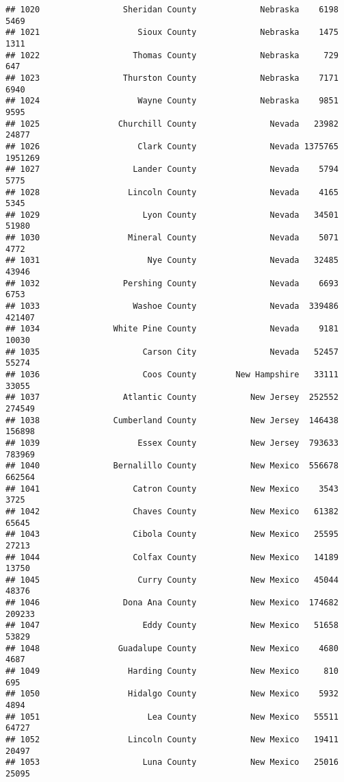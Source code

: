 \documentclass[
]{article}
\begin{document}
\begin{verbatim}
## 1020                 Sheridan County             Nebraska    6198    5469
## 1021                    Sioux County             Nebraska    1475    1311
## 1022                   Thomas County             Nebraska     729     647
## 1023                 Thurston County             Nebraska    7171    6940
## 1024                    Wayne County             Nebraska    9851    9595
## 1025                Churchill County               Nevada   23982   24877
## 1026                    Clark County               Nevada 1375765 1951269
## 1027                   Lander County               Nevada    5794    5775
## 1028                  Lincoln County               Nevada    4165    5345
## 1029                     Lyon County               Nevada   34501   51980
## 1030                  Mineral County               Nevada    5071    4772
## 1031                      Nye County               Nevada   32485   43946
## 1032                 Pershing County               Nevada    6693    6753
## 1033                   Washoe County               Nevada  339486  421407
## 1034               White Pine County               Nevada    9181   10030
## 1035                     Carson City               Nevada   52457   55274
## 1036                     Coos County        New Hampshire   33111   33055
## 1037                 Atlantic County           New Jersey  252552  274549
## 1038               Cumberland County           New Jersey  146438  156898
## 1039                    Essex County           New Jersey  793633  783969
## 1040               Bernalillo County           New Mexico  556678  662564
## 1041                   Catron County           New Mexico    3543    3725
## 1042                   Chaves County           New Mexico   61382   65645
## 1043                   Cibola County           New Mexico   25595   27213
## 1044                   Colfax County           New Mexico   14189   13750
## 1045                    Curry County           New Mexico   45044   48376
## 1046                 Dona Ana County           New Mexico  174682  209233
## 1047                     Eddy County           New Mexico   51658   53829
## 1048                Guadalupe County           New Mexico    4680    4687
## 1049                  Harding County           New Mexico     810     695
## 1050                  Hidalgo County           New Mexico    5932    4894
## 1051                      Lea County           New Mexico   55511   64727
## 1052                  Lincoln County           New Mexico   19411   20497
## 1053                     Luna County           New Mexico   25016   25095

\end{verbatim}
\end{document}
